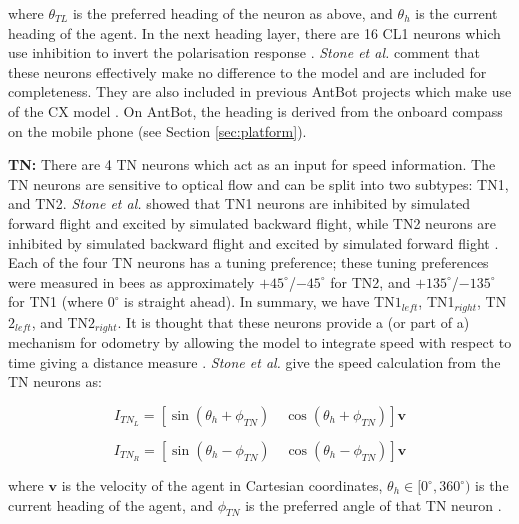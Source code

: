 \documentclass[a4paper,11pt,twoside,openright]{article}
\begin{document}
where $\theta_{TL} $ is the preferred heading of the neuron as above, and
$\theta_{h} $ is the current heading of the agent. In the next heading layer,
there are 16 CL1 neurons which use inhibition to invert the polarisation
response \cite{Stone2017}. \textit{Stone et al.} comment that these neurons
effectively make no difference to the model and are included for completeness.
They are also included in previous AntBot projects which make use of the CX model
\cite{Zhang2017, Scimeca2017}. On AntBot, the heading is derived from the onboard
compass on the mobile phone (see Section \ref{sec:platform}).
\newline
\par

\textbf{TN:}
There are 4 TN neurons which act as an input for speed information. The TN
neurons are sensitive to optical flow and can be split into two subtypes:
TN1, and TN2. \textit{Stone et al.} showed that TN1 neurons are inhibited by
simulated forward flight and excited by simulated backward flight, while TN2
neurons are inhibited by simulated backward flight and excited by simulated
forward flight \cite{Stone2017}. Each of the four TN neurons has a tuning
preference; these tuning preferences were measured in bees as approximately
$+45^{\circ}$/$-45^{\circ}$ for TN2, and $+135^{\circ}$/$-135^{\circ}$ for TN1
(where $0^{\circ}$ is straight ahead). In summary, we have TN$1_{left}$,
TN1$_{right}$, TN$2_{left}$, and TN$2_{right}$. It is thought that these neurons
provide a (or part of a) mechanism for odometry by allowing the model to
integrate speed with respect to time giving a distance measure \cite{Stone2017}.
\textit{Stone et al.} give the speed calculation from the TN neurons
as:

\begin{equation}
  I_{TN_{L}} =
  [ \sin (\theta_{h} + \phi_{TN}) \quad \cos (\theta_{h} + \phi_{TN}) ]\mathbf{v}
\end{equation}

\begin{equation}
  I_{TN_{R}} =
  [ \sin (\theta_{h} - \phi_{TN}) \quad \cos (\theta_{h} - \phi_{TN}) ]\mathbf{v}
\end{equation}

where $\mathbf{v}$ is the velocity of the agent in Cartesian coordinates,
$\theta_h \in [0^{\circ}, 360^{\circ})$ is the current heading of the agent, and
$\phi_{TN}$ is the preferred angle of that TN neuron \cite{Stone2017}.
\newline
\par
\end{document}

